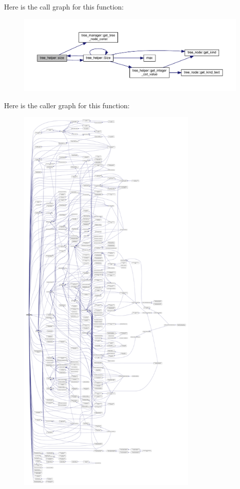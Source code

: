 Here is the call graph for this function\+:
\nopagebreak
\begin{figure}[H]
\begin{center}
\leavevmode
\includegraphics[width=350pt]{d7/d99/classtree__helper_a1dfdf8e77d57c307c0860c91d8c2b67d_cgraph}
\end{center}
\end{figure}
Here is the caller graph for this function\+:
\nopagebreak
\begin{figure}[H]
\begin{center}
\leavevmode
\includegraphics[height=550pt]{d7/d99/classtree__helper_a1dfdf8e77d57c307c0860c91d8c2b67d_icgraph}
\end{center}
\end{figure}
\mbox{\label{classtree__helper_a3bc8327685050e3716f167a51daddc3f}} 

